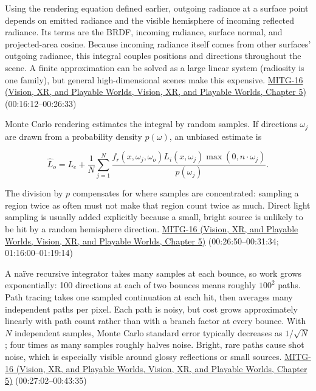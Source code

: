 Using the rendering equation defined earlier, outgoing radiance at a surface point depends on emitted radiance and the visible hemisphere of incoming reflected radiance. Its terms are the BRDF, incoming radiance, surface normal, and projected-area cosine. Because incoming radiance itself comes from other surfaces' outgoing radiance, this integral couples positions and directions throughout the scene. A finite approximation can be solved as a large linear system (radiosity is one family), but general high-dimensional scenes make this expensive. \href{../07-Vision-XR-and-Playable-Worlds/main.pdf\#nameddest=04-visual-computing-ii-ch036-mitg-16---global-illumination}{MITG-16 (Vision, XR, and Playable Worlds, Vision, XR, and Playable Worlds, Chapter 5)} (00:16:12--00:26:33)

Monte Carlo rendering estimates the integral by random samples. If directions \(\omega_j\) are drawn from a probability density \(p(\omega)\), an unbiased estimate is

\[
\widehat L_o=L_e+\frac1N\sum_{j=1}^{N}\frac{f_r(x,\omega_j,\omega_o)L_i(x,\omega_j)\max(0,n\cdot\omega_j)}{p(\omega_j)}.
\]

The division by \(p\) compensates for where samples are concentrated: sampling a region twice as often must not make that region count twice as much. Direct light sampling is usually added explicitly because a small, bright source is unlikely to be hit by a random hemisphere direction. \href{../07-Vision-XR-and-Playable-Worlds/main.pdf\#nameddest=04-visual-computing-ii-ch036-mitg-16---global-illumination}{MITG-16 (Vision, XR, and Playable Worlds, Vision, XR, and Playable Worlds, Chapter 5)} (00:26:50--00:31:34; 01:16:00--01:19:14)

A naïve recursive integrator takes many samples at each bounce, so work grows exponentially: 100 directions at each of two bounces means roughly \(100^2\) paths. Path tracing takes one sampled continuation at each hit, then averages many independent paths per pixel. Each path is noisy, but cost grows approximately linearly with path count rather than with a branch factor at every bounce. With \(N\) independent samples, Monte Carlo standard error typically decreases as \(1/\sqrt{N}\); four times as many samples roughly halves noise. Bright, rare paths cause shot noise, which is especially visible around glossy reflections or small sources. \href{../07-Vision-XR-and-Playable-Worlds/main.pdf\#nameddest=04-visual-computing-ii-ch036-mitg-16---global-illumination}{MITG-16 (Vision, XR, and Playable Worlds, Vision, XR, and Playable Worlds, Chapter 5)} (00:27:02--00:43:35)

